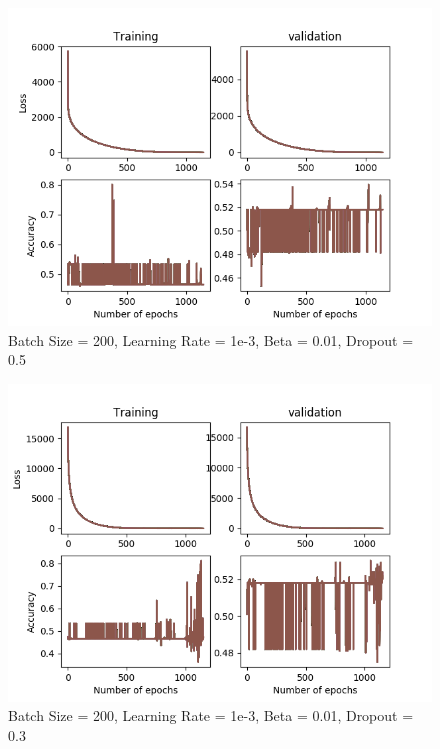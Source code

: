 \documentclass[12pt,reqno]{amsart}
\numberwithin{equation}{section}
\begin{document}
\begin{enumerate}
\begin{figure}[H]
\centering
\includegraphics[scale=0.6]{data12-1e-3-200-1e-2-5e-1}
\caption{Batch Size = 200, Learning Rate = 1e-3, Beta = 0.01, Dropout = 0.5}
\end{figure}

\begin{figure}[H]
\centering
\includegraphics[scale=0.6]{data12-1e-3-200-5e-2-3e-1}
\caption{Batch Size = 200, Learning Rate = 1e-3, Beta = 0.01, Dropout = 0.3}
\end{figure}


\end{enumerate}
\end{document}

